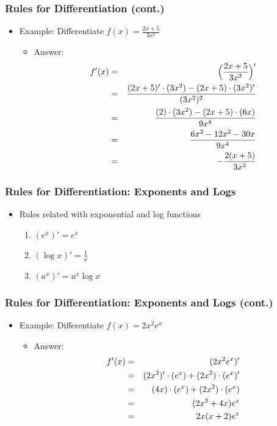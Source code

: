 \documentclass[pdflatex, 12pt]{beamer}
\begin{document}
\begin{frame}
\frametitle{Rules for Differentiation (cont.)}
\begin{itemize}
\item Example: Differentiate $f(x) = \frac{2x + 5}{3x^2}$
\vspace{0.4cm}
 \begin{itemize}
 \item Answer: 
 \begin{eqnarray}
 f'(x) &=& \Big(\frac{2x + 5}{3x^2}\Big)' \notag \\
 &=& \frac{(2x + 5)' \cdot (3x^2) - (2x + 5) \cdot (3x^2)'}{(3x^2)^2} \notag \\
 &=& \frac{(2) \cdot (3x^2) - (2x + 5) \cdot (6x)}{9x^4} \notag \\
 &=& \frac{6x^2 - 12x^2 - 30x}{9x^4} \notag \\
 &=& -\frac{2(x + 5)}{3x^3} \notag
 \end{eqnarray}
 \end{itemize}	
\end{itemize}
\end{frame}	

\begin{frame}
\frametitle{Rules for Differentiation: Exponents and Logs}
\begin{itemize}
\item Rules related with exponential and log functions
 \begin{enumerate}
 \item $(e^x)' = e^x$
 \item $(\log x)' = \frac{1}{x}$
 \item $(a^x)' = a^x \log x$
 \end{enumerate}
\end{itemize}
\end{frame}

\begin{frame}
\frametitle{Rules for Differentiation: Exponents and Logs (cont.)}
\begin{itemize}
\item Example: Differentiate $f(x) = 2x^2 e^x$
\vspace{0.4cm}
 \begin{itemize}
 \item Answer: 
 \begin{eqnarray}
 f'(x) &=& (2x^2 e^x)' \notag \\
 &=& (2x^2)' \cdot (e^x) + (2x^2) \cdot (e^x)' \notag \\
 &=& (4x) \cdot (e^x) + (2x^2) \cdot (e^x) \notag \\
 &=& (2x^2 + 4x) e^x \notag \\
 &=& 2x(x + 2) e^x \notag
 \end{eqnarray}
 \end{itemize}
\end{itemize}
\end{frame}
\end{document}
